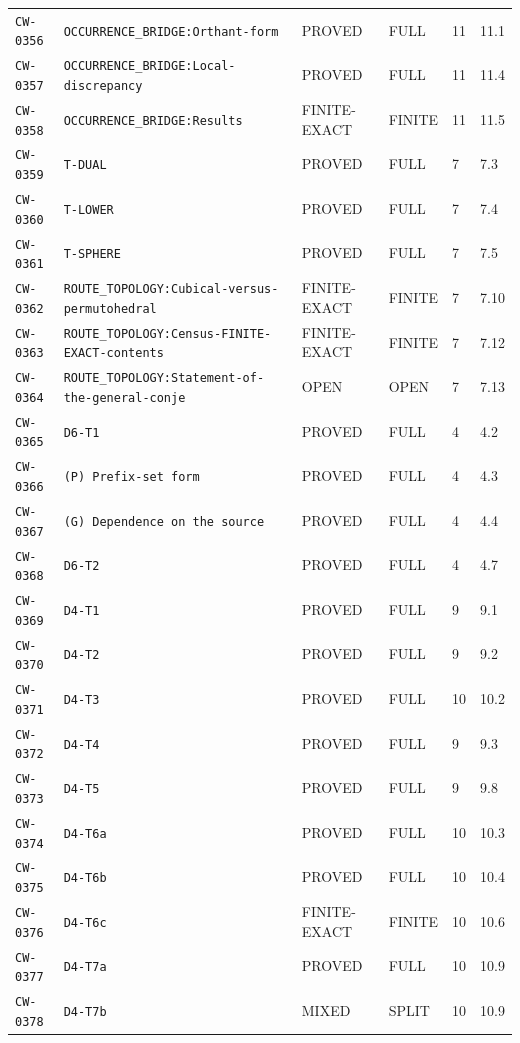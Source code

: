 \begin{center}
\begin{longtable}{@{}llllll@{}}
\texttt{CW-0356} & \texttt{OCCURRENCE\_BRIDGE:Orthant-form} & PROVED & FULL & 11 & 11.1\\
\texttt{CW-0357} & \texttt{OCCURRENCE\_BRIDGE:Local-discrepancy} & PROVED & FULL & 11 & 11.4\\
\texttt{CW-0358} & \texttt{OCCURRENCE\_BRIDGE:Results} & FINITE-EXACT & FINITE & 11 & 11.5\\
\texttt{CW-0359} & \texttt{T-DUAL} & PROVED & FULL & 7 & 7.3\\
\texttt{CW-0360} & \texttt{T-LOWER} & PROVED & FULL & 7 & 7.4\\
\texttt{CW-0361} & \texttt{T-SPHERE} & PROVED & FULL & 7 & 7.5\\
\texttt{CW-0362} & \texttt{ROUTE\_TOPOLOGY:Cubical-versus-permutohedral} & FINITE-EXACT & FINITE & 7 & 7.10\\
\texttt{CW-0363} & \texttt{ROUTE\_TOPOLOGY:Census-FINITE-EXACT-contents} & FINITE-EXACT & FINITE & 7 & 7.12\\
\texttt{CW-0364} & \texttt{ROUTE\_TOPOLOGY:Statement-of-the-general-conje} & OPEN & OPEN & 7 & 7.13\\
\texttt{CW-0365} & \texttt{D6-T1} & PROVED & FULL & 4 & 4.2\\
\texttt{CW-0366} & \texttt{(P) Prefix-set form} & PROVED & FULL & 4 & 4.3\\
\texttt{CW-0367} & \texttt{(G) Dependence on the source} & PROVED & FULL & 4 & 4.4\\
\texttt{CW-0368} & \texttt{D6-T2} & PROVED & FULL & 4 & 4.7\\
\texttt{CW-0369} & \texttt{D4-T1} & PROVED & FULL & 9 & 9.1\\
\texttt{CW-0370} & \texttt{D4-T2} & PROVED & FULL & 9 & 9.2\\
\texttt{CW-0371} & \texttt{D4-T3} & PROVED & FULL & 10 & 10.2\\
\texttt{CW-0372} & \texttt{D4-T4} & PROVED & FULL & 9 & 9.3\\
\texttt{CW-0373} & \texttt{D4-T5} & PROVED & FULL & 9 & 9.8\\
\texttt{CW-0374} & \texttt{D4-T6a} & PROVED & FULL & 10 & 10.3\\
\texttt{CW-0375} & \texttt{D4-T6b} & PROVED & FULL & 10 & 10.4\\
\texttt{CW-0376} & \texttt{D4-T6c} & FINITE-EXACT & FINITE & 10 & 10.6\\
\texttt{CW-0377} & \texttt{D4-T7a} & PROVED & FULL & 10 & 10.9\\
\texttt{CW-0378} & \texttt{D4-T7b} & MIXED & SPLIT & 10 & 10.9\\

\end{longtable}
\end{center}
